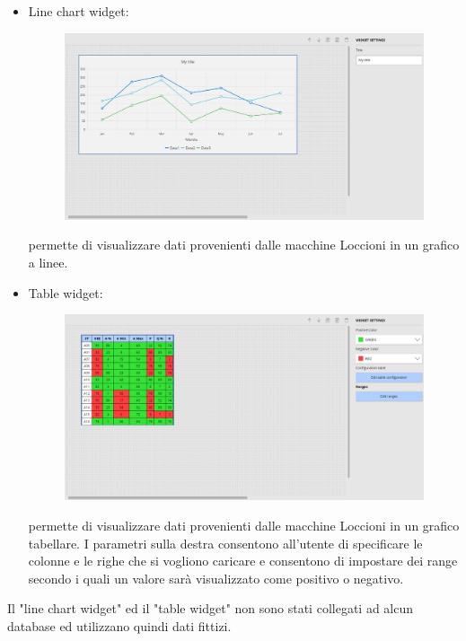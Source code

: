 \begin{itemize}
    \item Line chart widget: 
    
\begin{figure}[ht]
\centering
\includegraphics[scale=0.32]{images/Linechart.JPG}
\end{figure}
permette di visualizzare dati provenienti dalle macchine Loccioni in un grafico a linee.
\end{itemize}

\pagebreak
\begin{itemize}
    \item Table widget: 
    
\begin{figure}[ht]
\centering
\includegraphics[scale=0.35]{images/Table.png}
\end{figure}
permette di visualizzare dati provenienti dalle macchine Loccioni in un grafico tabellare. I parametri sulla destra consentono all'utente di specificare le colonne e le righe che si vogliono caricare e consentono di impostare dei range secondo i quali un valore sarà visualizzato come positivo o negativo.
\end{itemize}
Il "line chart widget" ed il "table widget" non sono stati collegati ad alcun database ed utilizzano quindi dati fittizi.